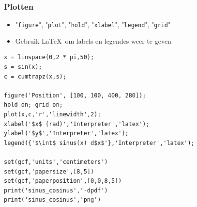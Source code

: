 \documentclass[t]{beamer}
\begin{document}
\begin{frame}[fragile]
	\frametitle{Plotten}
	\begin{itemize}
		\item "\lstinline{figure}", "\lstinline{plot}", "\lstinline{hold}", "\lstinline{xlabel}", "\lstinline{legend}", "\lstinline{grid}"
		\item Gebruik \LaTeX\ om labels en legendes weer te geven
	\end{itemize}

	\begin{lstlisting}
x = linspace(0,2 * pi,50);
s = sin(x);
c = cumtrapz(x,s);

figure('Position', [100, 100, 400, 280]);
hold on; grid on;
plot(x,c,'r','linewidth',2);
xlabel('$x$ (rad)','Interpreter','latex');
ylabel('$y$','Interpreter','latex');
legend({'$\int$ sinus(x) d$x$'},'Interpreter','latex');

set(gcf,'units','centimeters')
set(gcf,'papersize',[8,5])
set(gcf,'paperposition',[0,0,8,5])
print('sinus_cosinus','-dpdf')
print('sinus_cosinus','png')
	\end{lstlisting}
\end{frame}
\end{document}
